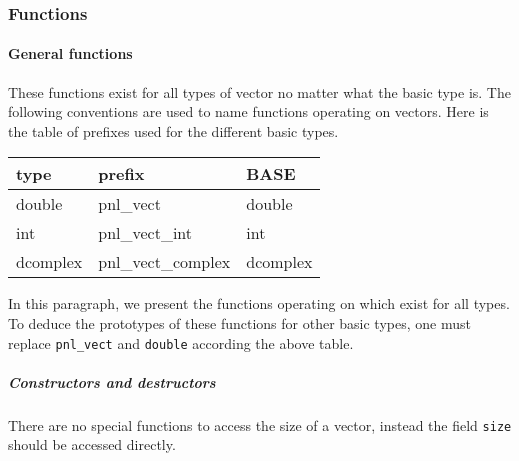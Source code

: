 \subsubsection{Functions}

\paragraph{General functions}
These functions exist for all types of vector no matter what the basic type
is. The following conventions are used to name functions operating on vectors.
Here is the table of prefixes used for the different basic types.

\begin{center}
  \begin{tabular}[t]{lll}
    type & prefix & BASE\\
    \hline
    double & pnl_vect & double \\
    \hline
    int & pnl_vect_int & int \\
    \hline
    dcomplex & pnl_vect_complex & dcomplex
  \end{tabular}
\end{center}

In this paragraph, we present the functions operating on \PnlVect
which exist for all types. To deduce the prototypes of these functions for
other basic types, one must replace {\tt pnl_vect} and {\tt double} according
the above table. 
\subparagraph{Constructors and destructors}

There are no special functions to access the size of a vector, instead the field
\verb!size! should be accessed directly.

